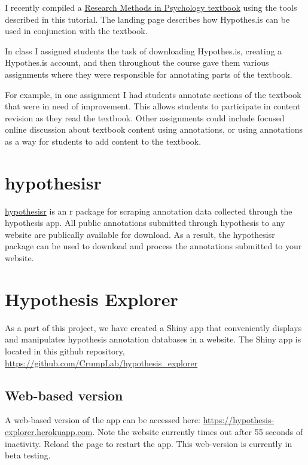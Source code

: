 \documentclass[]{book}
\begin{document}
I recently compiled a
\href{http://crumplab.github.io/ResearchMethods/}{Research Methods in
Psychology textbook} using the tools described in this tutorial. The
landing page describes how Hypothes.is can be used in conjunction with
the textbook.

In class I assigned students the task of downloading Hypothes.is,
creating a Hypothes.is account, and then throughout the course gave them
various assignments where they were responsible for annotating parts of
the textbook.

For example, in one assignment I had students annotate sections of the
textbook that were in need of improvement. This allows students to
participate in content revision as they read the textbook. Other
assignments could include focused online discussion about textbook
content using annotations, or using annotations as a way for students to
add content to the textbook.

\section{hypothesisr}\label{hypothesisr}

\href{https://github.com/mdlincoln/hypothesisr}{hypothesisr} is an r
package for scraping annotation data collected through the hypothesis
app. All public annotations submitted through hypothesis to any website
are publically available for download. As a result, the hypothesisr
package can be used to download and process the annotations submitted to
your website.

\section{Hypothesis Explorer}\label{hypothesis-explorer}

As a part of this project, we have created a Shiny app that conveniently
displays and manipulates hypothesis annotation databases in a website.
The Shiny app is located in this github repository,
\url{https://github.com/CrumpLab/hypothesis_explorer}

\subsection{Web-based version}\label{web-based-version}

A web-based version of the app can be accessed here:
\url{https://hypothesis-explorer.herokuapp.com}. Note the website
currently times out after 55 seconds of inactivity. Reload the page to
restart the app. This web-version is currently in beta testing.
\end{document}
